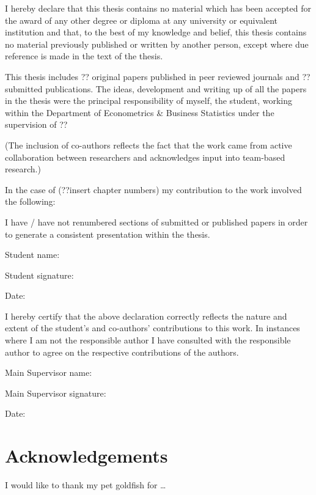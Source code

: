 \documentclass[
  letterpaper,
  DIV=11,
  numbers=noendperiod]{scrreprt}
\begin{document}

I hereby declare that this thesis contains no material which has been
accepted for the award of any other degree or diploma at any university
or equivalent institution and that, to the best of my knowledge and
belief, this thesis contains no material previously published or written
by another person, except where due reference is made in the text of the
thesis.

This thesis includes ?? original papers published in peer reviewed
journals and ?? submitted publications. The ideas, development and
writing up of all the papers in the thesis were the principal
responsibility of myself, the student, working within the Department of
Econometrics \& Business Statistics under the supervision of ??

(The inclusion of co-authors reflects the fact that the work came from
active collaboration between researchers and acknowledges input into
team-based research.)

In the case of (??insert chapter numbers) my contribution to the work
involved the following:

I have / have not renumbered sections of submitted or published papers
in order to generate a consistent presentation within the thesis.

Student name:

Student signature:

Date:

I hereby certify that the above declaration correctly reflects the
nature and extent of the student's and co-authors' contributions to this
work. In instances where I am not the responsible author I have
consulted with the responsible author to agree on the respective
contributions of the authors.

Main Supervisor name:

Main Supervisor signature:

Date:


\hypertarget{acknowledgements}{%
\chapter*{Acknowledgements}\label{acknowledgements}}


I would like to thank my pet goldfish for \ldots{}
\end{document}
